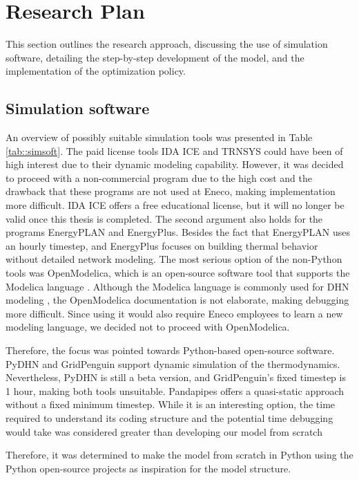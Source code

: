 \section{Research Plan}
This section outlines the research approach, discussing the use of simulation software, detailing the step-by-step development of the model, and the implementation of the optimization policy.

\subsection{Simulation software}\label{sec::SimulationModel}
An overview of possibly suitable simulation tools was presented in Table \ref{tab::simsoft}. The paid license tools IDA ICE and TRNSYS could have been of high interest due to their dynamic modeling capability. However, it was decided to proceed with a non-commercial program due to the high cost and the drawback that these programs are not used at Eneco, making implementation more difficult. IDA ICE offers a free educational license, but it will no longer be valid once this thesis is completed. The second argument also holds for the programs EnergyPLAN and EnergyPlus. Besides the fact that EnergyPLAN uses an hourly timestep, and EnergyPlus focuses on building thermal behavior without detailed network modeling. The most serious option of the non-Python tools was OpenModelica, which is an open-source software tool that supports the Modelica language \cite{Modelica}. Although the Modelica language is commonly used for DHN modeling \cite{KUNTUAROVA}, the OpenModelica documentation is not elaborate, making debugging more difficult. Since using it would also require Eneco employees to learn a new modeling language, we decided not to proceed with OpenModelica.

Therefore, the focus was pointed towards Python-based open-source software. PyDHN and GridPenguin support dynamic simulation of the thermodynamics. Nevertheless, PyDHN is still a beta version, and GridPenguin's fixed timestep is 1 hour, making both tools unsuitable. Pandapipes offers a quasi-static approach without a fixed minimum timestep. While it is an interesting option, the time required to understand its coding structure and the potential time debugging would take was considered greater than developing our model from scratch

Therefore, it was determined to make the model from scratch in Python using the Python open-source projects as inspiration for the model structure.

